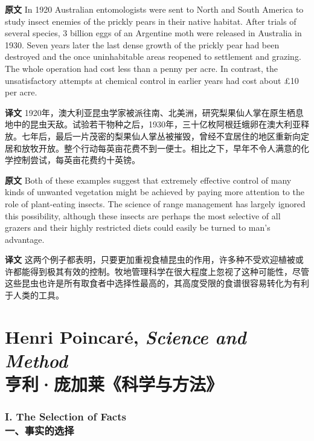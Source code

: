 \documentclass[UTF8,zihao=-4]{ctexart}
\begin{document}
\noindent\textbf{原文} In 1920 Australian entomologists were sent to North and South America to study insect enemies of the prickly pears in their native habitat. After trials of several species, 3 billion eggs of an Argentine moth were released in Australia in 1930. Seven years later the last dense growth of the prickly pear had been destroyed and the once uninhabitable areas reopened to settlement and grazing. The whole operation had cost less than a penny per acre. In contrast, the unsatisfactory attempts at chemical control in earlier years had cost about \pounds 10 per acre.
\par
\noindent\textbf{译文} 1920年，澳大利亚昆虫学家被派往南、北美洲，研究梨果仙人掌在原生栖息地中的昆虫天敌。试验若干物种之后，1930年，三十亿枚阿根廷蛾卵在澳大利亚释放。七年后，最后一片茂密的梨果仙人掌丛被摧毁，曾经不宜居住的地区重新向定居和放牧开放。整个行动每英亩花费不到一便士。相比之下，早年不令人满意的化学控制尝试，每英亩花费约十英镑。
\par\medskip

\noindent\textbf{原文} Both of these examples suggest that extremely effective control of many kinds of unwanted vegetation might be achieved by paying more attention to the role of plant-eating insects. The science of range management has largely ignored this possibility, although these insects are perhaps the most selective of all grazers and their highly restricted diets could easily be turned to man's advantage.
\par
\noindent\textbf{译文} 这两个例子都表明，只要更加重视食植昆虫的作用，许多种不受欢迎植被或许都能得到极其有效的控制。牧地管理科学在很大程度上忽视了这种可能性，尽管这些昆虫也许是所有取食者中选择性最高的，其高度受限的食谱很容易转化为有利于人类的工具。
\par


\part*{Henri Poincaré, \emph{Science and Method}\\亨利·庞加莱《科学与方法》}

\section*{I. The Selection of Facts\\一、事实的选择}
\end{document}
